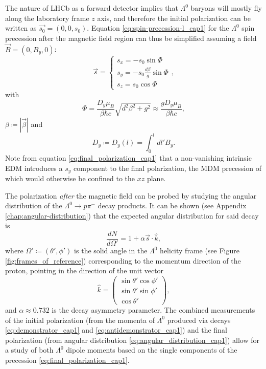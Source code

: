 The nature of LHCb as a forward detector implies that $\Lambda^0$ baryons will mostly fly along the laboratory frame $z$ axis, and therefore the initial polarization can be written as $\vec{s_0} = (0,0,s_0)$. Equation \eqref{eq:spin-precession-l_cap1} for the $\Lambda^0$ spin precession after the magnetic field region can thus be simplified assuming a field $\vec{B} = (0,B_y,0)$:
\begin{equation}
\vec{s} =
\begin{cases}
	s_x = -s_0 \sin\Phi\\
	s_y = -s_0 \frac{d\beta}{g} \sin\Phi \\
	s_z = s_0 \cos\Phi
\end{cases},
\label{eq:final_polarization_cap1}
\end{equation}
with
\begin{equation}
\Phi
=
\frac{D_y \mu_B}{\beta \hbar c} \sqrt{d^2 \beta^2 + g^2}
\approx
\frac{g D_y \mu_B}{\beta \hbar c}
,
\end{equation}
$\beta \coloneqq \left\lvert \vec{\beta} \right\rvert$ and
\begin{equation}
D_y \coloneqq D_y (l) = \int_0^l dl' B_y.
\end{equation}
Note from equation \eqref{eq:final_polarization_cap1} that a non-vanishing intrinsic EDM introduces a $s_y$ component to the final polarization, the MDM precession of which would otherwise be confined to the $xz$ plane.

The polarization \textit{after} the magnetic field can be probed by studying the angular distribution of the $\Lambda^0 \rightarrow p\pi^-$ decay products.
It can be shown (see Appendix \ref{chap:angular-distribution}) that the expected angular distribution for said decay is
\begin{equation}
\frac{dN}{d\Omega'} = 1+ \alpha \vec{s} \cdot \hat{k},
\label{eq:angular_distribution_cap1}
\end{equation}
where $\Omega' \coloneqq (\theta',\phi')$ is the solid angle in the $\Lambda^0$ helicity frame (see Figure \ref{fig:frames_of_reference}) corresponding to the momentum direction of the proton, pointing in the direction of the unit vector
\begin{equation}
\hat{k}
=
\begin{pmatrix}
	\sin \theta' \cos \phi' \\
	\sin \theta' \sin \phi' \\
	\cos \theta'
\end{pmatrix},
\end{equation}
and $\alpha \approx 0.732$ \cite{PDG} is the decay asymmetry parameter.
The combined measurements of the initial polarization (from the momenta of $\Lambda^0$ produced via decays \eqref{eq:demonstrator_cap1} and \eqref{eq:antidemonstrator_cap1}) and the final polarization (from angular distribution \eqref{eq:angular_distribution_cap1}) allow for a study of both $\Lambda^0$ dipole moments based on the single components of the precession \eqref{eq:final_polarization_cap1}.

